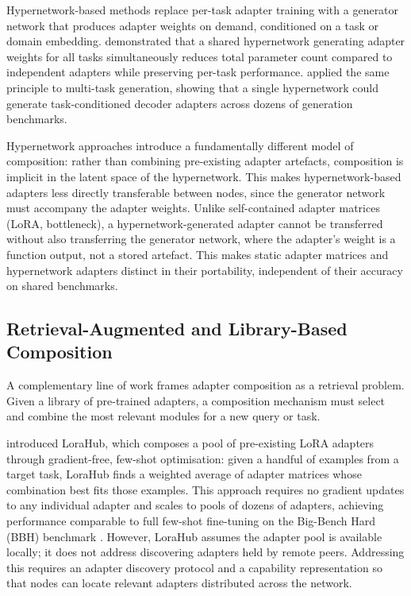 Hypernetwork-based methods replace per-task adapter training with a generator network
that produces adapter weights on demand, conditioned on a task or domain embedding.
\citet{ZhangHyperPELT2022} demonstrated that a shared hypernetwork generating adapter
weights for all tasks simultaneously reduces total parameter count compared to
independent adapters while preserving per-task performance.
\citet{IvisonHyperdecoders2022} applied the same principle to multi-task generation,
showing that a single hypernetwork could generate task-conditioned decoder adapters
across dozens of generation benchmarks.

Hypernetwork approaches introduce a fundamentally different model of composition:
rather than combining pre-existing adapter artefacts, composition is implicit in the
latent space of the hypernetwork. This makes hypernetwork-based adapters less directly
transferable between nodes, since the generator network must accompany the adapter
weights. Unlike self-contained adapter matrices (LoRA, bottleneck), a hypernetwork-generated
adapter cannot be transferred without also transferring the generator network, where the adapter's weight is a function output, not a stored artefact. This makes static
adapter matrices and hypernetwork adapters distinct in their portability, independent
of their accuracy on shared benchmarks.

\subsection{Retrieval-Augmented and Library-Based Composition}
\label{sec:adapter_composition:library}

A complementary line of work frames adapter composition as a retrieval problem. Given a
library of pre-trained adapters, a composition mechanism must select and combine the most
relevant modules for a new query or task.

\citet{Huang2023} introduced LoraHub, which composes a pool of pre-existing LoRA adapters
through gradient-free, few-shot optimisation: given a handful of examples from a target
task, LoraHub finds a weighted average of adapter matrices whose combination best fits
those examples. This approach requires no gradient updates to any individual adapter and
scales to pools of dozens of adapters, achieving performance comparable to full few-shot
fine-tuning on the Big-Bench Hard (BBH) benchmark \citep{Huang2023}. However, LoraHub
assumes the adapter pool is available locally; it does not address discovering adapters
held by remote peers. Addressing this requires an adapter discovery protocol and a capability representation so that nodes can locate relevant adapters
distributed across the network.

